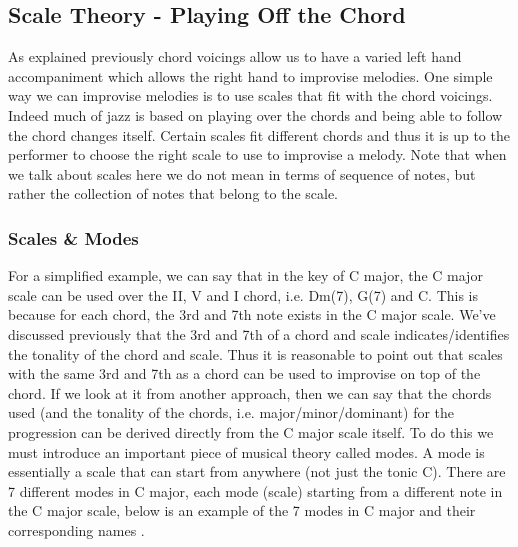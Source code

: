 \documentclass[pdftex,12pt,a4paper]{report}
\begin{document}
\subsection{Scale Theory - Playing Off the Chord}
As explained previously chord voicings allow us to have a varied left hand accompaniment which allows the right hand to improvise melodies. One simple way we can improvise melodies is to use scales that fit with the chord voicings. Indeed much of jazz is based on playing over the chords and being able to follow the chord changes itself. Certain scales fit different chords and thus it is up to the performer to choose the right scale to use to improvise a melody. Note that when we talk about scales here we do not mean in terms of sequence of notes, but rather the collection of notes that belong to the scale.

\subsubsection{Scales \& Modes}
For a simplified example, we can say that in the key of C major, the C major scale can be used over the II, V and I chord, i.e. Dm(7), G(7) and C. This is because for each chord, the 3rd and 7th note exists in the C major scale. We've discussed previously that the 3rd and 7th of a chord and scale indicates/identifies the tonality of the chord and scale. Thus it is reasonable to point out that scales with the same 3rd and 7th as a chord can be used to improvise on top of the chord.
If we look at it from another approach, then we can say that the chords used (and the tonality of the chords, i.e. major/minor/dominant) for the progression can be derived directly from the C major scale itself. To do this we must introduce an important piece of musical theory called modes. A mode is essentially a scale that can start from anywhere (not just the tonic C). There are 7 different modes in C major, each mode (scale) starting from a different note in the C major scale, below is an example of the 7 modes in C major and their corresponding names  \cite{jazzmusicmakers}.
\end{document}
